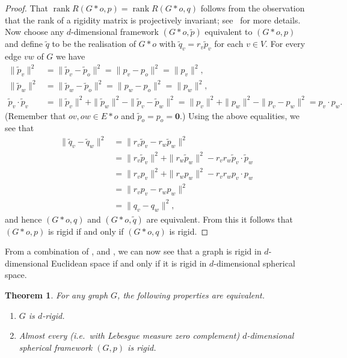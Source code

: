 \documentclass[11pt]{article}
\newtheorem{theorem}[theo]{Theorem}
\theoremstyle{definition}
\providecommand{\ie}{i.e.\ }
\numberwithin{equation}{section}
\DeclareMathOperator{\rank}{rank}
\begin{document}
\begin{proof}
	That $\rank R(G*o,p) = \rank R(G*o,q)$ follows from the observation that the rank of a rigidity matrix is projectively invariant;
	see~\cite[Theorem 1]{Izm09} for more details.
	Now choose any $d$-dimensional framework $(G*o,\tilde{p})$ equivalent to $(G*o,p)$ and define $\tilde{q}$ to be the realisation of $G*o$ with $\tilde{q}_v = r_v \tilde{p}_v$ for each $v \in V$.
	For every edge $vw$ of $G$ we have
	\begin{align*}
		\|\tilde{p}_v\|^2 &= \|\tilde{p}_v - \tilde{p}_o\|^2 = \|p_v - p_o\|^2 = \|p_v\|^2,\\
		\|\tilde{p}_w\|^2 &= \|\tilde{p}_w - \tilde{p}_o\|^2 = \|p_w - p_o\|^2 = \|p_w\|^2,\\
		\tilde{p}_v \cdot \tilde{p}_v &=  \|\tilde{p}_v\|^2 + \|\tilde{p}_w\|^2 - \| \tilde{p}_v - \tilde{p}_w\|^2= \|p_v\|^2 + \|p_w\|^2 - \| p_v - p_w\|^2 = p_v \cdot p_w.
	\end{align*}
	(Remember that $ov , ow \in E*o$ and $\tilde{p}_o = p_o = \mathbf{0}$.)
	Using the above equalities,
	we see that
	\begin{align*}
		\|\tilde{q}_v-\tilde{q}_w\|^2 &= \|r_v\tilde{p}_v-r_w\tilde{p}_w\|^2 \\
		&= \|r_v\tilde{p}_v\|^2 + \|r_w\tilde{p}_w\|^2 - r_v r_w\tilde{p}_v \cdot \tilde{p}_w \\
		&= \|r_vp_v\|^2 + \|r_wp_w\|^2 - r_v r_wp_v \cdot p_w  \\
		&= \|r_vp_v-r_wp_w\|^2 \\
		&= \|q_v-q_w\|^2,
	\end{align*}
	and hence $(G*o,q)$ and $(G*o,\tilde{q})$ are equivalent.
	From this it follows that $(G*o,p)$ is rigid if and only if $(G*o,q)$ is rigid.
\end{proof}

From a combination of ,  and ,
we can now see that a graph is rigid in $d$-dimensional Euclidean space if and only if it is rigid in $d$-dimensional spherical space.

\begin{theorem}\label{t:sphereclassic}
	For any graph $G$, the following properties are equivalent.
	\begin{enumerate}
		\item $G$ is $d$-rigid.
		\item Almost every (\ie with Lebesgue measure zero complement) $d$-dimensional spherical framework $(G,p)$ is rigid.
	\end{enumerate}
\end{theorem}
\end{document}
